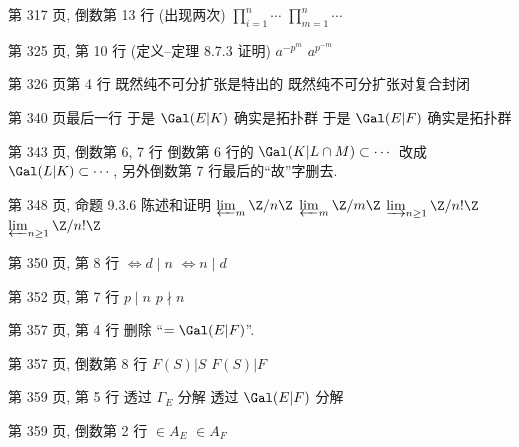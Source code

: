\documentclass{AJerrata}
\begin{document}
\begin{Errata}
        \item[第 317 页, 倒数第 13 行]
        (出现两次)\;
        \Orig $\prod_{i=1}^n \cdots$
        \Corr $\prod_{m=1}^n \cdots$
        
        \item[第 325 页, 第 10 行 (定义--定理 8.7.3 证明)]
        \Orig $a^{-p^m}$
        \Corr $a^{p^{-m}}$
        
        \item[第 326 页第 4 行]
        \Orig 既然纯不可分扩张是特出的
        \Corr 既然纯不可分扩张对复合封闭
        
        \item[第 340 页最后一行]
        \Orig 于是 $\Gal(E|K)$ 确实是拓扑群
        \Corr 于是 $\Gal(E|F)$ 确实是拓扑群
        
        \item[第 343 页, 倒数第 6, 7 行]
        倒数第 6 行的 $\Gal(K | L \cap M) \subset \cdots$ 改成 $\Gal(L|K) \subset \cdots$, 另外倒数第 7 行最后的``故''字删去.
        
   		\item[第 348 页, 命题 9.3.6 陈述和证明]
        \Orig $\varprojlim_m \Z/n\Z$
        \Corr $\varprojlim_m \Z/m\Z$
        \newline
        \Orig $\varinjlim_{n \geq 1} \Z/n!\Z$
        \Corr $\varprojlim_{n \geq 1} \Z/n!\Z$
        
        \item[第 350 页, 第 8 行]
        \Orig $\iff d \mid n$
        \Corr $\iff n \mid d$
        
   		\item[第 352 页, 第 7 行]
        \Orig $p \mid n$
        \Corr $p \nmid n$
        
        \item[第 357 页, 第 4 行]
        删除 ``$= \Gal(E|F)$''.
        
        \item[第 357 页, 倒数第 8 行]
        \Orig $F(S)|S$
        \Corr $F(S)|F$
        
        \item[第 359 页, 第 5 行]
        \Orig 透过 $\Gamma_E$ 分解
        \Corr 透过 $\Gal(E|F)$ 分解
        
        \item[第 359 页, 倒数第 2 行]
        \Orig $\in A_E$
        \Corr $\in A_F$
        

\end{Errata}
\end{document}
